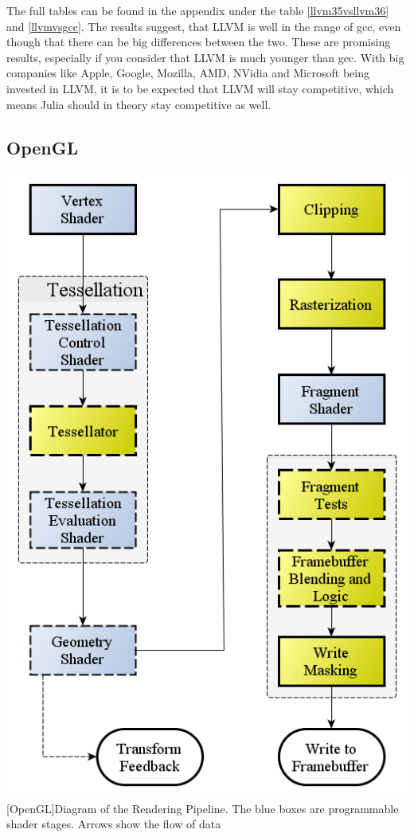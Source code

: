 The full tables can be found in the appendix under the table \cref{llvm35vsllvm36} and \cref{llvmvsgcc}.
The results suggest, that \ac{LLVM} is well in the range of \ac{gcc}, even though that there can be big differences between the two.
These are promising results, especially if you consider that \ac{LLVM} is much younger than \ac{gcc}. 
With big companies like Apple\cite{GoogleAppleLLVM}, Google\cite{GoogleAppleLLVM}, Mozilla\cite{Rust}, AMD\cite{LLVMAMD}, NVidia\cite{LLVMNvidia} and Microsoft\cite{MicrosoftLLVM} being invested in LLVM, it is to be expected that \ac{LLVM} will stay competitive, which means Julia should in theory stay competitive as well.


\subsection{\ac{OpenGL}}

\vspace{1em}
\begin{minipage}{\linewidth}
    \centering
    \includegraphics[width=0.5\linewidth]{graphics/RenderingPipeline.png}
    [OpenGL]{Diagram of the Rendering Pipeline. The blue boxes are programmable shader stages. Arrows show the flow of data\cite{OpenGLPipeline}}
    \label{fig:opengl}
\end{minipage}


